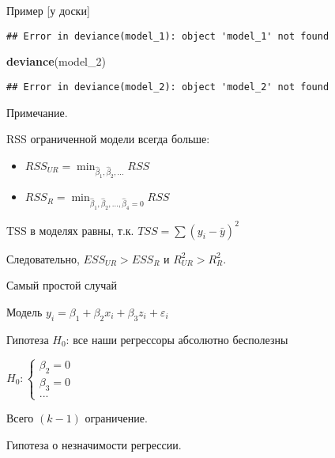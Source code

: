 \documentclass[russian,ignorenonframetext,]{beamer}
\newenvironment{Shaded}{\begin{snugshade}}{\end{snugshade}}
\newcommand{\KeywordTok}[1]{\textcolor[rgb]{0.13,0.29,0.53}{\textbf{{#1}}}}
\newcommand{\NormalTok}[1]{{#1}}
\begin{document}
\begin{frame}[fragile]{Пример {[}у доски{]}}
\begin{verbatim}
## Error in deviance(model_1): object 'model_1' not found
\end{verbatim}

\begin{Shaded}
\begin{Highlighting}[]
\KeywordTok{deviance}\NormalTok{(model_2)}
\end{Highlighting}
\end{Shaded}

\begin{verbatim}
## Error in deviance(model_2): object 'model_2' not found
\end{verbatim}

\end{frame}

\begin{frame}{Примечание.}

RSS ограниченной модели всегда больше:

\begin{itemize}
\item
  \(RSS_{UR} = \min_{\hat{\beta}_1, \hat{\beta}_2, \ldots} RSS\)
\item
  \(RSS_{R} = \min_{\hat{\beta}_1, \hat{\beta}_2, \ldots, \hat{\beta}_4=0} RSS\)
\end{itemize}

TSS в моделях равны, т.к. \(TSS=\sum ( y_i -\bar{y})^2\)

Следовательно, \(ESS_{UR}>ESS_R\) и \(R^2_{UR}>R^2_R\).

\end{frame}

\begin{frame}{Самый простой случай}

Модель \(y_i = \beta_1 + \beta_2 x_i + \beta_3 z_i + \varepsilon_i\)

Гипотеза \(H_0\): все наши регрессоры абсолютно бесполезны

\(H_0: \begin{cases} \beta_2 =0 \\ \beta_3 = 0 \\ ... \end{cases}\)

Всего \((k-1)\) ограничение.

Гипотеза о незначимости регрессии.

\end{frame}
\end{document}
